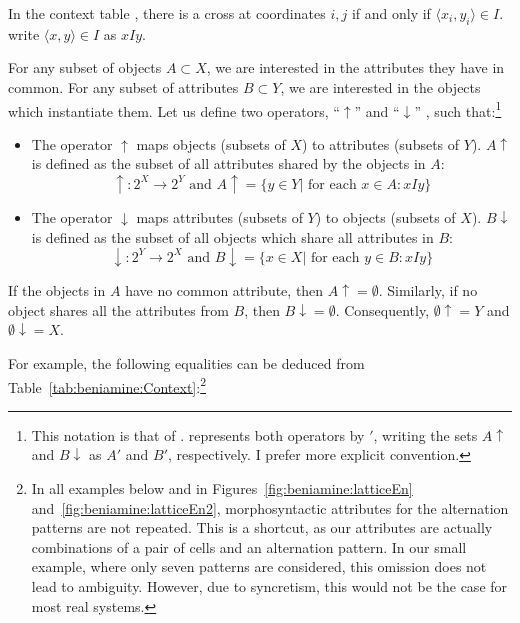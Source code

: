 \documentclass[output=paper]{langscibook}
\begin{document}
    In the context table \context{}, there is a cross at coordinates $i,j$ if and only if $\langle x_{i}, y_{i}\rangle \in I$. \citet{GanterWille1998} write $\langle x,y \rangle \in I$ as $xIy$.
    
    For any subset of objects $A \subset X$, we are interested in the attributes they have in common. For any subset of attributes  $B \subset Y$, we are interested in the objects which instantiate them. Let us define two operators, ``$\uparrow$'' and ``$\downarrow$'' \citep[~6-7]{Belohlavek2009}, such that:\footnote{This notation is that of \citet{Belohlavek2009}. \citet{GanterWille1998} represents both operators by $'$, writing the sets $A\uparrow$ and $B\downarrow$ as $A'$ and $B'$, respectively. I prefer  more explicit convention.}
    
    \begin{itemize}
        \item The operator $\uparrow$ maps objects (subsets of $X$) to attributes (subsets of $Y$). $A\uparrow$ is defined as the subset of all attributes shared by the objects in $A$:\\
        $$\uparrow:2^{X} \to 2^{Y} \mbox{ and } A\uparrow = \{y \in Y | \mbox{ for each } x \in A : xIy\}$$
        \item The operator $\downarrow$ maps attributes (subsets of $Y$) to  objects (subsets of $X$). $B\downarrow$ is defined as the subset of all objects which share all attributes in $B$:\\
        $$\downarrow:2^{Y} \to 2^{X} \mbox{ and } B\downarrow = \{x \in X | \mbox{ for each } y \in B :  xIy\}$$
    \end{itemize}
    
    If the objects in $A$ have no common attribute, then $A\uparrow = \emptyset$. Similarly, if no object shares all the attributes from $B$, then $B\downarrow = \emptyset$. Consequently, $\emptyset\uparrow = Y$ and $\emptyset\downarrow = X$.
    
    For example, the following equalities can be deduced from Table~\ref{tab:beniamine:Context}:\footnote{In all examples below and in Figures~\ref{fig:beniamine:latticeEn} and~\ref{fig:beniamine:latticeEn2}, morphosyntactic attributes for the alternation patterns are not repeated. This is a shortcut, as our attributes are actually combinations of a pair of cells and an alternation pattern. In our small example, where only seven patterns are considered, this omission  does not lead to ambiguity. However, due to syncretism, this would not be the case for most real systems.}
    
\end{document}
